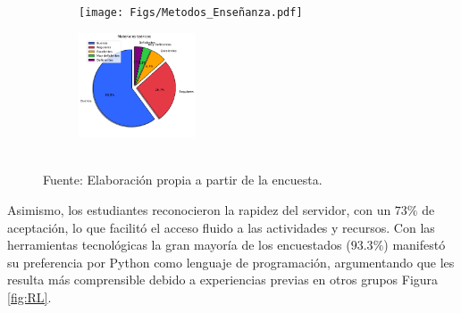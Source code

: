 \documentclass[letter,oneside,12pt,spanish]{report}
\begin{document}
\begin{figure}[h]
	\centering
    \begin{subfigure}
        \centering
        \texttt{[image: Figs/Metodos\_Enseñanza.pdf]}
    \end{subfigure}
	\hfill
    \begin{subfigure}
        \centering
        \includegraphics[width=0.38\textwidth]{Figs/materiales_teoricos.pdf}
    \end{subfigure}
	\label{fig:MM}
	\\ Fuente: Elaboración propia a partir de la encuesta.
\end{figure}

\newpage

Asimismo, los estudiantes reconocieron la rapidez del servidor, con un $73\%$ de aceptación, lo que facilitó el acceso fluido a las actividades y recursos.
Con las herramientas tecnológicas la gran mayoría de los encuestados ($93.3\%$) manifestó su preferencia por Python como lenguaje de programación, argumentando que les resulta más comprensible debido a experiencias previas en otros grupos Figura \ref{fig:RL}. 
\end{document}
